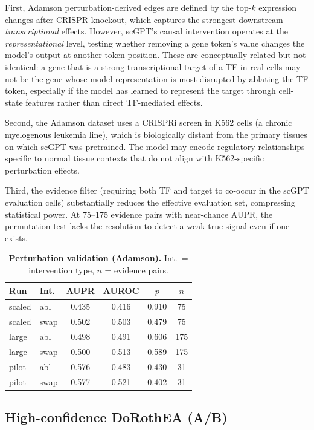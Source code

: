 \documentclass[10pt,letterpaper]{article}
\begin{document}
First, Adamson perturbation-derived edges are defined by the top-$k$ expression
changes after CRISPR knockout, which captures the strongest downstream
\textit{transcriptional} effects. However, scGPT's causal intervention operates
at the \textit{representational} level, testing whether removing a gene token's
value changes the model's output at another token position. These are
conceptually related but not identical: a gene that is a strong transcriptional
target of a TF in real cells may not be the gene whose model representation is
most disrupted by ablating the TF token, especially if the model has learned to
represent the target through cell-state features rather than direct
TF-mediated effects.

Second, the Adamson dataset uses a CRISPRi screen in K562 cells (a chronic
myelogenous leukemia line), which is biologically distant from the primary
tissues on which scGPT was pretrained. The model may encode regulatory
relationships specific to normal tissue contexts that do not align with
K562-specific perturbation effects.

Third, the evidence filter (requiring both TF and target to co-occur in the
scGPT evaluation cells) substantially reduces the effective evaluation set,
compressing statistical power. At 75--175 evidence pairs with near-chance AUPR,
the permutation test lacks the resolution to detect a weak true signal even if
one exists.

\begin{table}[!ht]
\centering
\caption{{\bf Perturbation validation (Adamson).}
Int.\ = intervention type, $n$ = evidence pairs.}
\label{tab:perturb}
\begin{tabular}{llcccc}
\toprule
\textbf{Run} & \textbf{Int.} & \textbf{AUPR} & \textbf{AUROC} & \textbf{$p$} & \textbf{$n$} \\
\midrule
scaled & abl & 0.435 & 0.416 & 0.910 & 75 \\
scaled & swap & 0.502 & 0.503 & 0.479 & 75 \\
large & abl & 0.498 & 0.491 & 0.606 & 175 \\
large & swap & 0.500 & 0.513 & 0.589 & 175 \\
pilot & abl & 0.576 & 0.483 & 0.430 & 31 \\
pilot & swap & 0.577 & 0.521 & 0.402 & 31 \\
\bottomrule
\end{tabular}
\end{table}

\subsection*{High-confidence DoRothEA (A/B)}
\end{document}
